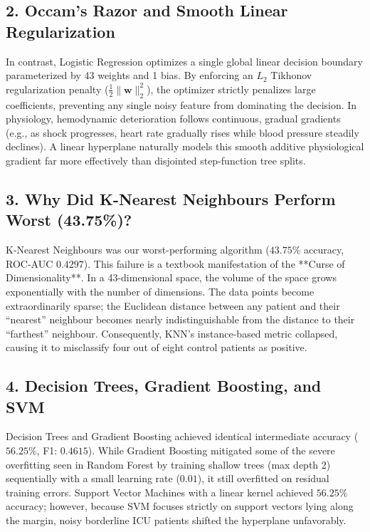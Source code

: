 \subsection{2. Occam's Razor and Smooth Linear Regularization}
In contrast, Logistic Regression optimizes a single global linear decision boundary parameterized by 43 weights and 1 bias. By enforcing an $L_2$ Tikhonov regularization penalty ($\frac{1}{2} \|\mathbf{w}\|_2^2$), the optimizer strictly penalizes large coefficients, preventing any single noisy feature from dominating the decision. In physiology, hemodynamic deterioration follows continuous, gradual gradients (e.g., as shock progresses, heart rate gradually rises while blood pressure steadily declines). A linear hyperplane naturally models this smooth additive physiological gradient far more effectively than disjointed step-function tree splits.

\subsection{3. Why Did K-Nearest Neighbours Perform Worst (43.75\%)?}
K-Nearest Neighbours was our worst-performing algorithm ($43.75\%$ accuracy, ROC-AUC $0.4297$). This failure is a textbook manifestation of the **Curse of Dimensionality**. In a 43-dimensional space, the volume of the space grows exponentially with the number of dimensions. The data points become extraordinarily sparse; the Euclidean distance between any patient and their ``nearest'' neighbour becomes nearly indistinguishable from the distance to their ``farthest'' neighbour. Consequently, KNN's instance-based metric collapsed, causing it to misclassify four out of eight control patients as positive.

\subsection{4. Decision Trees, Gradient Boosting, and SVM}
Decision Trees and Gradient Boosting achieved identical intermediate accuracy ($56.25\%$, F1: $0.4615$). While Gradient Boosting mitigated some of the severe overfitting seen in Random Forest by training shallow trees (max depth 2) sequentially with a small learning rate ($0.01$), it still overfitted on residual training errors. Support Vector Machines with a linear kernel achieved $56.25\%$ accuracy; however, because SVM focuses strictly on support vectors lying along the margin, noisy borderline ICU patients shifted the hyperplane unfavorably.

